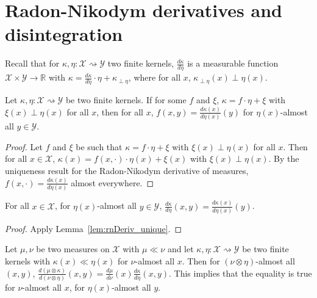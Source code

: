 \chapter{Radon-Nikodym derivatives and disintegration}

Recall that for $\kappa, \eta : \mathcal X \rightsquigarrow \mathcal Y$ two finite kernels, $\frac{d \kappa}{d \eta}$ is a measurable function $\mathcal X \times \mathcal Y \to \mathbb{R}$ with $\kappa = \frac{d \kappa}{d \eta} \cdot \eta + \kappa_{\perp \eta}$, where for all $x$, $\kappa_{\perp \eta}(x) \perp \eta(x)$.

\begin{lemma}
  \label{lem:rnDeriv_unique}
  Let $\kappa, \eta : \mathcal X \rightsquigarrow \mathcal Y$ be two finite kernels. If for some $f$ and $\xi$, $\kappa = f \cdot \eta + \xi$ with $\xi(x) \perp \eta(x)$ for all $x$, then for all $x$, $f(x, y) = \frac{d \kappa(x)}{d \eta(x)}(y)$ for $\eta(x)$-almost all $y \in \mathcal Y$.
\end{lemma}

\begin{proof}
Let $f$ and $\xi$ be such that $\kappa = f \cdot \eta + \xi$ with $\xi(x) \perp \eta(x)$ for all $x$. Then for all $x \in \mathcal X$, $\kappa(x) = f(x, \cdot) \cdot \eta(x) + \xi(x)$ with $\xi(x) \perp \eta(x)$. By the uniqueness result for the Radon-Nikodym derivative of measures, $f(x, \cdot) = \frac{d \kappa(x)}{d \eta(x)}$ almost everywhere.
\end{proof}

\begin{corollary}
  \label{cor:rnDeriv_value}
  For all $x \in \mathcal X$, for $\eta(x)$-almost all $y \in \mathcal Y$, $\frac{d \kappa}{d \eta}(x, y) = \frac{d \kappa(x)}{d \eta(x)}(y)$.
\end{corollary}

\begin{proof}
Apply Lemma~\ref{lem:rnDeriv_unique}.
\end{proof}

\begin{lemma}
  \label{lem:rnDeriv_compProd_aux}
  Let $\mu, \nu$ be two measures on $\mathcal X$ with $\mu \ll \nu$ and let $\kappa, \eta : \mathcal X \rightsquigarrow \mathcal Y$ be two finite kernels with $\kappa(x) \ll \eta(x)$ for $\nu$-almost all $x$. Then for $(\nu \otimes \eta)$-almost all $(x, y)$, $\frac{d (\mu \otimes \kappa)}{d (\nu \otimes \eta)}(x,y) = \frac{d\mu}{d\nu}(x)\frac{d \kappa}{d \eta}(x,y)$.
  This implies that the equality is true for $\nu$-almost all $x$, for $\eta(x)$-almost all $y$.
\end{lemma}

